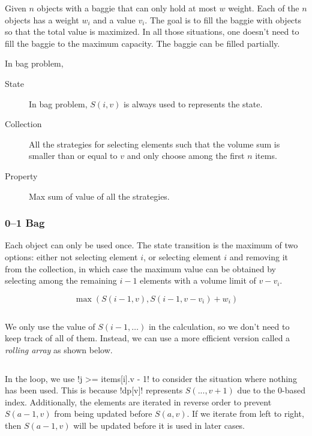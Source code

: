 \documentclass{article}
\begin{document}
Given $n$ objects with a baggie that can only hold at most $w$ weight. Each of the $n$ objects has a weight $w_i$ and a value $v_i$. The goal is to fill the baggie with objects so that the total value is maximized. In all those situations, one doesn't need to fill the baggie to the maximum capacity. The baggie can be filled partially.

In bag problem,

\begin{description}
	\item[State] In bag problem, $S(i, v)$ is always used to represents the state.
	\item[Collection] All the strategies for selecting elements such that the volume sum is smaller than or equal to $v$ and only choose among the first $n$ items.
	\item[Property] Max sum of value of all the strategies.
\end{description}

\subsubsection{0--1 Bag}

Each object can only be used once. The state transition is the maximum of two options: either not selecting element $i$, or selecting element $i$ and removing it from the collection, in which case the maximum value can be obtained by selecting among the remaining $i - 1$ elements with a volume limit of $v - v_i$.

\[
	\max(S(i - 1, v), S(i - 1, v - v_i) + w_i)
\]

\begin{center}
	\inputminted{cpp}{src/struct-0-1-rudimentary-bag.cpp}%
\end{center}

We only use the value of $S(i - 1, \ldots)$ in the calculation, so we don't need to keep track of all of them. Instead, we can use a more efficient version called a \emph{rolling array} as shown below.

\begin{center}
	\inputminted[firstline=21, lastline=27]{cpp}{src/struct-0-1-bag.cpp}
\end{center}

In the loop, we use \mono!j >= items[i].v - 1! to consider the situation where nothing has been used. This is because \mono!dp[v]! represents $S(..., v + 1)$ due to the 0-based index. Additionally, the elements are iterated in reverse order to prevent $S(a-1,v)$ from being updated before $S(a,v)$. If we iterate from left to right, then $S(a-1,v)$ will be updated before it is used in later cases.
\end{document}
